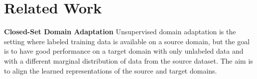 \documentclass[10pt,twocolumn,letterpaper]{article}
\begin{document}




\section{Related Work}
\label{sec:relatedwork}
\textbf{Closed-Set Domain Adaptation}
Unsupervised domain adaptation is the setting where labeled training data is 
available on a source domain, but the goal is to have good performance on a 
target domain with only unlabeled data and with a different marginal distribution
of data from the source dataset. The aim is to align the learned representations 
of the source and target domains.
\end{document}
